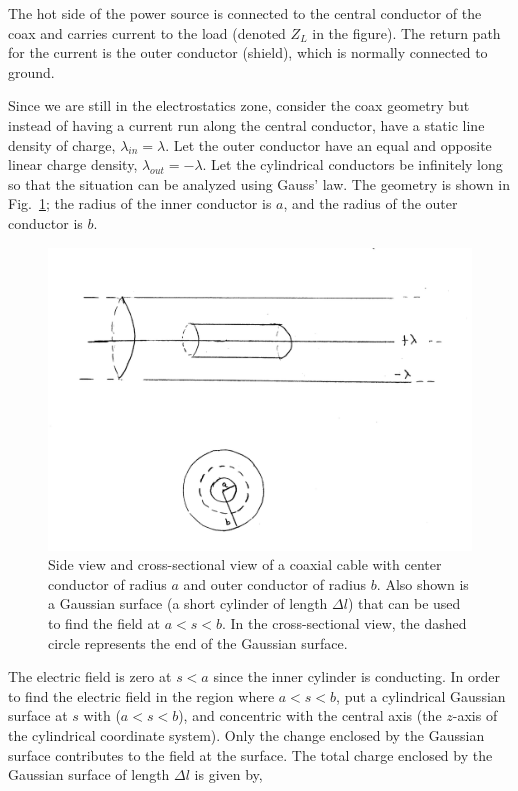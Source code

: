 \documentclass[12pt]{article}
\begin{document}
\begin{flushleft}
 The hot side of the power source is connected to the central conductor of the coax and carries current to the load (denoted $Z_{L}$ in the figure).  The return path for the current is the outer conductor (shield), which is normally connected to ground.
 
Since we are still in the electrostatics zone, consider the coax geometry but instead of having a current run along the central conductor, have a static line density of charge, $\lambda_{in}=\lambda$.  Let the outer conductor have an equal and opposite linear charge density, $\lambda_{out}=-\lambda$.  Let the cylindrical conductors be infinitely long so that the situation can be analyzed using Gauss' law.  The geometry is shown in Fig.~\ref{fig:coax2}; the radius of the inner conductor is $a$, and the radius of the outer conductor is $b$.

\begin{figure}[h]
\centering
\includegraphics*[trim=0cm 0cm 0cm 0cm, clip=true, width=0.6\columnwidth]{coax2.png}
\caption{\small Side view and cross-sectional view of a coaxial cable with center conductor of radius $a$ and outer conductor of radius $b$.  Also shown is a Gaussian surface (a short cylinder of length $\Delta l$) that can be used to find the field at $a<s<b$.  In the cross-sectional view, the dashed circle represents the end of the Gaussian surface.}
\label{fig:coax2}
\end{figure}

The electric field is zero at $s<a$ since the inner cylinder is conducting.  In order to find the electric field in the region where $a<s<b$, put a cylindrical Gaussian surface at $s$ with ($a<s<b$), and concentric with the central axis (the $z$-axis of the cylindrical coordinate system).  Only the change enclosed by the Gaussian surface contributes to the field at the surface.  The total charge enclosed by the Gaussian surface of length $\Delta l$ is given by,


\end{flushleft}
\end{document}
